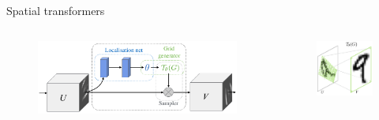 \documentclass[xcolor=pdftex,dvipsnames,table,mathserif]{beamer}
\begin{document}
\begin{frame}{Spatial transformers~\cite{jaderberg_spatial_2016}}

  \begin{columns}
    \begin{column}{.75\textwidth}
      \begin{figure}[ht]
        \centering
        \includegraphics[width=\textwidth]{spatial_transformer}
      \end{figure}

    \end{column}

\pause

    \begin{column}{.25\textwidth}
      \begin{figure}[ht]
        \centering
        \includegraphics[width=\textwidth]{sampling_grid}
      \end{figure}
    \end{column}
  \end{columns}


\end{frame}
\end{document}
